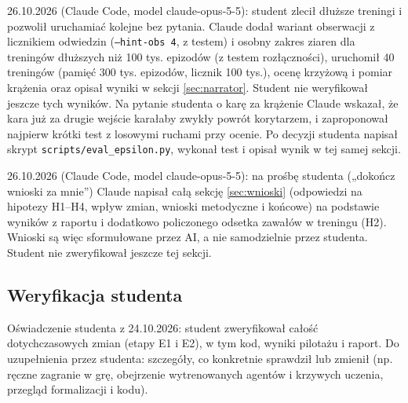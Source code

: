 26.10.2026 (Claude Code, model claude-opus-5-5): student zlecił dłuższe treningi
i pozwolił uruchamiać kolejne bez pytania. Claude dodał wariant obserwacji z licznikiem
odwiedzin (\texttt{--hint-obs 4}, z testem) i osobny zakres ziaren dla treningów
dłuższych niż 100 tys. epizodów (z testem rozłączności), uruchomił 40 treningów (pamięć
300 tys. epizodów, licznik 100 tys.), ocenę krzyżową i pomiar krążenia oraz opisał
wyniki w sekcji \ref{sec:narrator}. Student nie weryfikował jeszcze tych wyników.
Na pytanie studenta o karę za krążenie Claude wskazał, że kara już za drugie wejście
karałaby zwykły powrót korytarzem, i zaproponował najpierw krótki test z losowymi
ruchami przy ocenie. Po decyzji studenta napisał skrypt
\texttt{scripts/eval\_epsilon.py}, wykonał test i opisał wynik w tej samej sekcji.

26.10.2026 (Claude Code, model claude-opus-5-5): na prośbę studenta („dokończ
wnioski za mnie”) Claude napisał całą sekcję \ref{sec:wnioski} (odpowiedzi na hipotezy
H1--H4, wpływ zmian, wnioski metodyczne i końcowe) na podstawie wyników z raportu
i dodatkowo policzonego odsetka zawałów w treningu (H2). Wnioski są więc
sformułowane przez AI, a nie samodzielnie przez studenta. Student nie zweryfikował
jeszcze tej sekcji.

\subsection*{Weryfikacja studenta}
Oświadczenie studenta z 24.10.2026: student zweryfikował całość dotychczasowych
zmian (etapy E1 i E2), w tym kod, wyniki pilotażu i raport.
Do uzupełnienia przez studenta: szczegóły, co konkretnie sprawdził lub zmienił
(np. ręczne zagranie w grę, obejrzenie wytrenowanych agentów i krzywych uczenia,
przegląd formalizacji i kodu).
